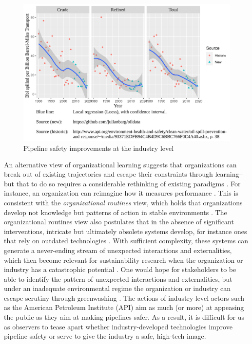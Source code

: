\begin{figure}
	\caption{Pipeline safety improvements at the industry level}
	\centerline{\includegraphics{../illustrations/population_learning_4.png}}
\end{figure}

An alternative view of organizational learning suggests that organizations can break out of existing trajectories and escape their constraints through learning--but that to do so requires a considerable rethinking of existing paradigms \citep{March2010}. For instance, an organization can reimagine how it measures performance \citep{Argyris1978}. This is consistent with the \textit{organizational routines} view, which holds that organizations develop not knowledge but patterns of action in stable environments \citep{Bingham2011}. The organizational routines view also postulates that in the absence of significant interventions, intricate but ultimately obsolete systems develop, for instance ones that rely on outdated technologies \citep{March1991}. With sufficient complexity, these systems can generate a never-ending stream of unexpected interactions and externalities, which then become relevant for sustainability research when the organization or industry has a catastrophic potential \citep{Perrow1984, Beck1992}. One would hope for stakeholders to be able to identify the pattern of unexpected interactions and externalities, but under an inadequate environmental regime the organization or industry can escape scrutiny through greenwashing \citep{Lyon2015}. The actions of industry level actors such as the American Petroleum Institute (API) aim as much (or more) at appeasing the public as they aim at making pipelines safer. As a result, it is difficult for us as observers to tease apart whether industry-developed technologies improve pipeline safety or serve to give the industry a safe, high-tech image.

